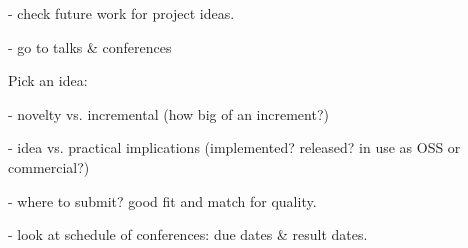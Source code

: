 - check future work for project ideas.

- go to talks \& conferences

Pick an idea:

- novelty vs. incremental (how big of an increment?)

- idea vs. practical implications
  (implemented? released? in use as OSS or commercial?)

- where to submit? good fit and match for quality.

- look at schedule of conferences: due dates \& result dates.

